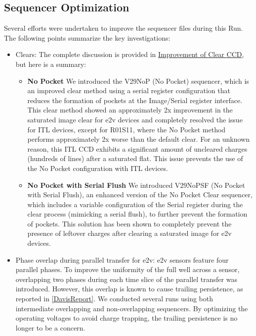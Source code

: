 \subsection{Sequencer Optimization}\label{sequencer-optimization}



Several efforts were undertaken to improve the sequencer files during this Run. The following points summarize the key investigations:

\begin{itemize}
\item Clears:  The complete discussion is provided in
  \href{https://sitcomtn-148.lsst.io/\#serialRemnants}{Improvement of
  Clear CCD}, but here is a summary:

  \begin{itemize}
  \item
    \textbf{No Pocket}
  We introduced the V29\label{nop}{NoP} (No Pocket)
  sequencer, which is an improved clear method using a serial register
  configuration that reduces the formation of pockets at the Image/Serial
  register interface. This clear method showed an approximately 2x
  improvement in the saturated image clear for e2v devices and completely
  resolved the issue for ITL devices, except for R01\label{s11}{S11},
  where the No Pocket method performs approximately 2x worse than the default clear. 
  For an unknown reason, this ITL CCD exhibits a significant amount of uncleared charges 
  (hundreds of lines) after a saturated flat. This issue prevents the use of the No
  Pocket configuration with ITL devices.

  \item
    \textbf{No Pocket with Serial Flush}
  We introduced V29\label{nopsf}{NoPSF} (No Pocket with Serial Flush), an enhanced version of the No Pocket Clear
  sequencer, which includes a variable configuration of the Serial register
  during the clear process (mimicking a serial flush), to further prevent the
  formation of pockets. This solution has been shown to completely prevent the presence of leftover charges after clearing a saturated image for e2v devices.
  \end{itemize}
  

\item Phase overlap during parallel transfer for e2v: e2v sensors feature four parallel phases. To improve the uniformity of the full well across a sensor, overlapping two phases during each time slice of the parallel transfer was introduced. However, this overlap is known to cause trailing persistence, as reported in \ref{DavisReport}. We conducted several runs using both intermediate overlapping and non-overlapping sequencers. By optimizing the operating voltages to avoid charge trapping, the trailing persistence is no longer to be a concern.
\end{itemize}

